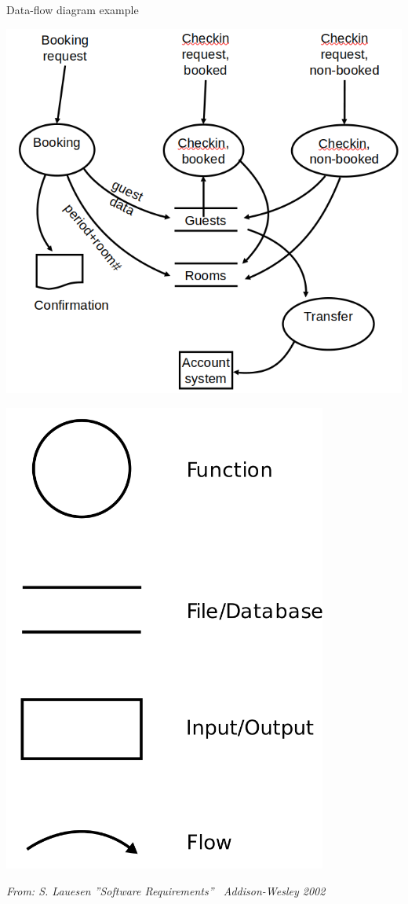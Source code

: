 \begin{Slide}{Data-flow diagram example}
\begin{minipage}[t]{0.6\textwidth}
\vspace{0.4em}\includegraphics[width=1.0\textwidth]{../img/data-flow-diagram}
\vspace{-1.4em}
\end{minipage}%
\hfill\begin{minipage}[t]{0.3\textwidth}
\vspace{-0.1em}\includegraphics[width=0.8\textwidth]{../img/data-flow-diagram-symbols}
\end{minipage}%

{\vspace*{1em}\fontsize{5}{5}\itshape\selectfont From: S. Lauesen ''Software Requirements'' \textcopyright~Addison-Wesley 2002}
\end{Slide}

